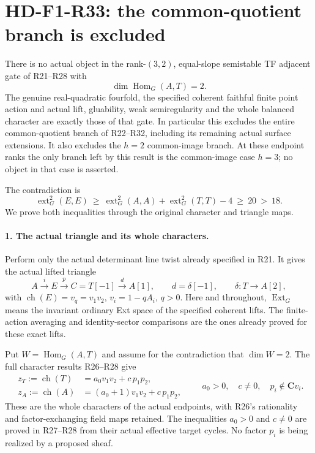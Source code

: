 \section[HD-F1-R33: two forward maps are impossible]{HD-F1-R33: the common-quotient branch is excluded}
\label{sec:followup-rm-two-forward-maps-exclusion}

There is no actual object in the rank-$(3,2)$,
equal-slope semistable TF adjacent gate of
R21--R28 with
\[
                 \dim\operatorname{Hom}_G(A,T)=2.
 \tag{F1R33.1}
\]
The genuine real-quadratic fourfold, the specified
coherent faithful finite point action and actual
lift, gluability, weak semiregularity and the
whole balanced character are exactly those of
that gate. In particular this excludes the
entire common-quotient branch of R22--R32,
including its remaining actual surface
extensions. It also excludes the $h=2$
common-image branch. At these endpoint ranks
the only branch left by this result is the
common-image case $h=3$; no object in that
case is asserted.

The contradiction is
\[
 \operatorname{ext}^2_G(E,E)
 \ \ge\ \operatorname{ext}^2_G(A,A)
          +\operatorname{ext}^2_G(T,T)-4
 \ \ge\ 20\ >\ 18.
 \tag{F1R33.2}
\]
We prove both inequalities through the
original character and triangle maps.

\paragraph{1. The actual triangle and its whole characters.}
Perform only the actual determinant line
twist already specified in R21. It gives
the actual lifted triangle
\[
 A\xrightarrow{i}E\xrightarrow{p}C=T[-1]
       \xrightarrow{d}A[1],\qquad d=\delta[-1],
       \qquad \delta:T\longrightarrow A[2],
 \tag{F1R33.3}
\]
with $\operatorname{ch}(E)=v_q=v_1v_2$,
$v_i=1-qA_i$, $q>0$. Here and throughout,
$\operatorname{Ext}_G$ means the invariant
ordinary Ext space of the specified coherent
lifts. The finite-action averaging and
identity-sector comparisons are the ones
already proved for these exact lifts.

Put $W=\operatorname{Hom}_G(A,T)$ and assume
for the contradiction that $\dim W=2$.
The full character results R26--R28 give
\[
 \begin{split}
 z_T:=\operatorname{ch}(T)&=a_0v_1v_2+c\,p_1p_2,\\
 z_A:=\operatorname{ch}(A)&=(a_0+1)v_1v_2+c\,p_1p_2,
 \end{split}
 \qquad
 a_0>0,\quad c\ne0,\quad p_i\notin\mathbf C v_i.
 \tag{F1R33.4}
\]
These are the whole characters of the actual
endpoints, with R26's rationality and
factor-exchanging field maps retained.
The inequalities $a_0>0$ and $c\ne0$
are proved in R27--R28 from their actual
effective target cycles. No factor $p_i$
is being realized by a proposed sheaf.

